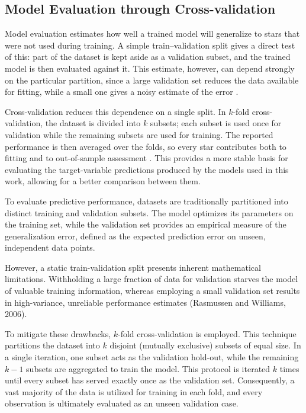 \fi

\subsection{Model Evaluation through Cross-validation} \label{sec:evaluation}

Model evaluation estimates how well a trained model will generalize to stars that were not used during training. A simple train--validation split gives a direct test of this: part of the dataset is kept aside as a validation subset, and the trained model is then evaluated against it. This estimate, however, can depend strongly on the particular partition, since a large validation set reduces the data available for fitting, while a small one gives a noisy estimate of the error \citep{rasmussen2006gpml}.

Cross-validation reduces this dependence on a single split. In $k$-fold cross-validation, the dataset is divided into $k$ subsets; each subset is used once for validation while the remaining subsets are used for training. The reported performance is then averaged over the folds, so every star contributes both to fitting and to out-of-sample assessment \citep{rasmussen2006gpml}. This provides a more stable basis for evaluating the target-variable predictions produced by the models used in this work, allowing for a better comparison between them.

\iffalse

To evaluate predictive performance, datasets are traditionally partitioned into distinct training and validation subsets. The model optimizes its parameters on the training set, while the validation set provides an empirical measure of the generalization error, defined as the expected prediction error on unseen, independent data points. 

However, a static train-validation split presents inherent mathematical limitations. Withholding a large fraction of data for validation starves the model of valuable training information, whereas employing a small validation set results in high-variance, unreliable performance estimates (Rasmussen and Williams, 2006). 

To mitigate these drawbacks, $k$-fold cross-validation is employed. This technique partitions the dataset into $k$ disjoint (mutually exclusive) subsets of equal size. In a single iteration, one subset acts as the validation hold-out, while the remaining $k-1$ subsets are aggregated to train the model. This protocol is iterated $k$ times until every subset has served exactly once as the validation set. Consequently, a vast majority of the data is utilized for training in each fold, and every observation is ultimately evaluated as an unseen validation case.

